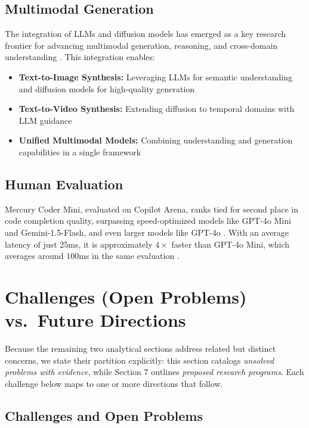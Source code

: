 \documentclass[11pt]{article}
\begin{document}
\subsection{Multimodal Generation}

The integration of LLMs and diffusion models has emerged as a key research frontier for advancing multimodal generation, reasoning, and cross-domain understanding \cite{benjdira2025integrating}. This integration enables:

\begin{itemize}
    \item \textbf{Text-to-Image Synthesis:} Leveraging LLMs for semantic understanding and diffusion models for high-quality generation \cite{benjdira2025integrating}
    \item \textbf{Text-to-Video Synthesis:} Extending diffusion to temporal domains with LLM guidance \cite{benjdira2025integrating}
    \item \textbf{Unified Multimodal Models:} Combining understanding and generation capabilities in a single framework \cite{khanna2025mercury}
\end{itemize}

\subsection{Human Evaluation}

Mercury Coder Mini, evaluated on Copilot Arena, ranks tied for second place in code completion quality, surpassing speed-optimized models like GPT-4o Mini and Gemini-1.5-Flash, and even larger models like GPT-4o \cite{khanna2025mercury}. With an average latency of just 25ms, it is approximately $4\times$ faster than GPT-4o Mini, which averages around 100ms in the same evaluation \cite{khanna2025mercury}.

\section{Challenges (Open Problems) vs.\ Future Directions}

Because the remaining two analytical sections address related but distinct concerns, we state their partition explicitly: this section catalogs \emph{unsolved problems with evidence}, while Section 7 outlines \emph{proposed research programs}. Each challenge below maps to one or more directions that follow.

\subsection{Challenges and Open Problems}
\end{document}
